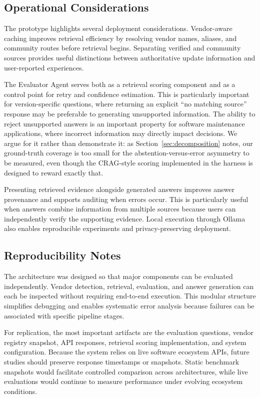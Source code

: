 \documentclass[acmsmall,review,anonymous,screen]{acmart}
\begin{document}
\subsection{Operational Considerations}

The prototype highlights several deployment considerations. Vendor-aware
caching improves retrieval efficiency by resolving vendor names,
aliases, and community routes before retrieval begins. Separating
verified and community sources provides useful distinctions between
authoritative update information and user-reported experiences.

The Evaluator Agent serves both as a retrieval scoring component and as
a control point for retry and confidence estimation. This is
particularly important for version-specific questions, where returning
an explicit ``no matching source'' response may be preferable to
generating unsupported information. The ability to reject unsupported
answers is an important property for software maintenance applications, where
incorrect information may directly impact decisions. We argue for it rather than
demonstrate it: as Section~\ref{sec:decomposition} notes, our ground-truth
coverage is too small for the abstention-versus-error asymmetry to be measured,
even though the CRAG-style scoring implemented in the harness is designed to
reward exactly that.

Presenting retrieved evidence alongside generated answers improves
answer provenance and supports auditing when errors occur. This is
particularly useful when answers combine information from multiple
sources because users can independently verify the supporting evidence.
Local execution through Ollama also enables reproducible experiments
and privacy-preserving deployment.

\subsection{Reproducibility Notes}

The architecture was designed so that major components can be evaluated
independently. Vendor detection, retrieval, evaluation, and answer
generation can each be inspected without requiring end-to-end
execution. This modular structure simplifies debugging and enables
systematic error analysis because failures can be associated with
specific pipeline stages.

For replication, the most important artifacts are the evaluation
questions, vendor registry snapshot, API responses, retrieval scoring
implementation, and system configuration. Because the system relies on
live software ecosystem APIs, future studies should preserve response
timestamps or snapshots. Static benchmark snapshots would facilitate
controlled comparison across architectures, while live evaluations
would continue to measure performance under evolving ecosystem
conditions.
\end{document}
